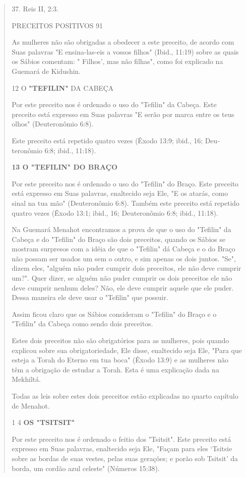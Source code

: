 \begin{quote}
37. Reis II, 2:3.

PRECEITOS POSITIVOS 91

As mulheres não são obrigadas a obedecer a este preceito, de acor­do com
Suas palavras "E ensina-las-eis a vossos filhos" (Ibid., 11:19) sobre as
quais os Sábios comentam: " Filhos', mas não filhas", como foi explicado
na Guemará de Kidushin.

12 O \textbf{"TEFILIN"} DA CABEÇA

Por este preceito nos é ordenado o uso do "Tefilin" da Cabeça. Este
preceito está expresso em Suas palavras "E serão por marca entre os teus
olhos" (Deuteronômio 6:8).

Este preceito está repetido quatro vezes (Êxodo 13:9; ibid., 16;
Deu­teronômio 6:8; ibid., 11:18).

\textbf{13 O "TEFILIN" DO BRAÇO}

Por este preceito nos é ordenado o uso do "Tefilin" do Braço. Este
preceito está expresso em Suas palavras, enaltecido seja Ele, "E os
atarás, como sinal na tua mão" (Deuteronômio 6:8). Também este preceito
está repetido qua­tro vezes (Êxodo 13:1; ibid., 16; Deuteronômio 6:8;
ibid., 11:18).

Na Guemará Menahot encontramos a prova de que o uso do "Tefi­lin" da
Cabeça e do "Tefilin" do Braço são dois preceitos, quando os Sábios se
mostram surpresos com a idéia de que o "Tefilin" dá Cabeça e o do Braço
não possam ser usados um sem o outro, e sim apenas os dois juntos. "Se",
di­zem eles, "alguém não puder cumprir dois preceitos, ele não deve
cumprir um?". Quer dizer, se alguém não puder cumprir os dois preceitos
ele não deve cum­prir nenhum deles? Não, ele deve cumprir aquele que ele
puder. Dessa maneira ele deve usar o "Tefilin" que possuir.

Assim ficou claro que os Sábios consideram o "Tefilin" do Braço e o
"Tefilin" da Cabeça como sendo dois preceitos.

Estes dois preceitos não são obrigatórios para as mulheres, pois quan­do
explicou sobre sua obrigatoriedade, Ele disse, enaltecido seja Ele,
"Para que esteja a Torah do Eterno em tua boca" (Êxodo 13:9) e as
mulheres não têm a obrigação de estudar a Torah. Esta é uma explicação
dada na Mekhiltá.

Todas as leis sobre estes dois preceitos estão explicadas no quarto
capítulo de Menahot.

1 4 \textbf{OS "TSITSIT"}

Por este preceito nos é ordenado o feitio dos "Tsitsit". Este precei­to
está expresso em Suas palavras, enaltecido seja Ele, "Façam para eles
`Tsitsie sobre as bordas de suas vestes, pelas suas gerações; e porão
sob Tsitsit' da borda, um cordão azul celeste" (Números 15:38).


\end{quote}
